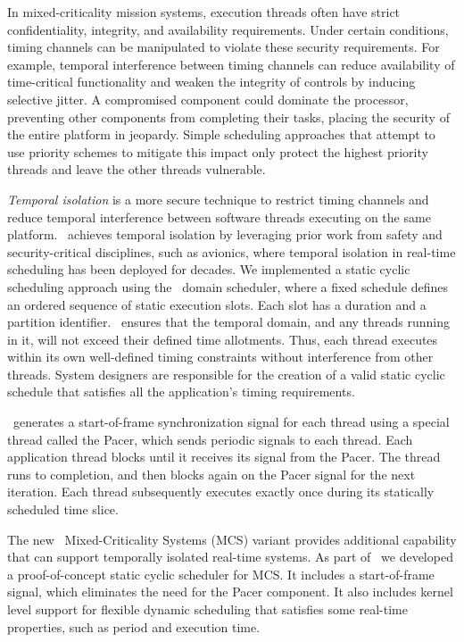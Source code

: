 
In mixed-criticality mission systems,
execution threads often 
have strict confidentiality, integrity, and availability requirements. 
Under certain conditions,
timing channels can be manipulated to violate these security requirements. 
For example, temporal interference between timing channels
can reduce availability of time-critical functionality 
and weaken the integrity of controls by inducing selective jitter.
A compromised component could dominate the processor, 
preventing other components from completing their tasks, placing the security 
of the entire platform in jeopardy. 
Simple scheduling approaches that attempt to use priority schemes to mitigate 
this impact only protect the highest priority threads and leave the other
threads vulnerable.

\emph{Temporal isolation} is a more secure technique to restrict timing channels and
reduce temporal interference between software threads executing on the same platform. 
\briefcase\ achieves temporal isolation by leveraging
prior work from safety and security-critical disciplines, such as
avionics, where temporal isolation in real-time scheduling has been
deployed for decades.
We implemented a static cyclic scheduling
approach using the \selFour\ domain scheduler, where a fixed schedule
defines an ordered sequence of static execution slots. Each slot has a
duration and a partition identifier.  \selFour\ ensures that the
temporal domain, and any threads running in it, will not exceed their defined
time allotments. Thus, each thread executes within its own
well-defined timing constraints without interference from other threads.
System designers are responsible for the
creation of a valid static cyclic schedule that
satisfies all the application's timing requirements.

\briefcase\ generates a start-of-frame synchronization signal for each thread using
a special thread called the Pacer, which sends periodic signals
to each thread. Each application thread blocks until it receives its
signal from the Pacer. The thread runs to completion, and then
blocks again on the Pacer signal for the next iteration. 
Each thread subsequently executes
exactly once during its statically scheduled time slice.

The new \selFour\ Mixed-Criticality Systems (MCS) variant provides
additional capability that can support temporally isolated
real-time systems. 
As part of \briefcase\ we developed a proof-of-concept static cyclic
scheduler for MCS.
It includes a start-of-frame signal, which
eliminates the need for the Pacer component. It also includes kernel
level support for flexible dynamic scheduling that satisfies some
real-time properties, such as period and execution time.

